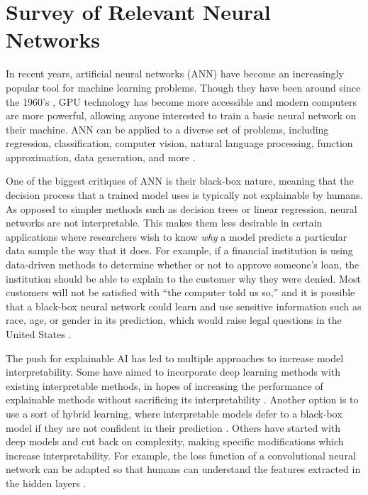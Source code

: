 \chapter{Survey of Relevant Neural Networks}

In recent years, artificial neural networks (ANN) have become an increasingly popular tool for machine learning problems. Though they have been around since the 1960's \cite{rosenblatt1961}, GPU technology has become more accessible and modern computers are more powerful, allowing anyone interested to train a basic neural network on their machine. ANN can be applied to a diverse set of problems, including regression, classification, computer vision, natural language processing, function approximation, data generation, and more \cite{hammerstrom1993} \cite{zhang2000}.

One of the biggest critiques of ANN is their black-box nature, meaning that the decision process that a trained model uses is typically not explainable by humans. As opposed to simpler methods such as decision trees or linear regression, neural networks are not interpretable. This makes them less desirable in certain applications where researchers wish to know \textit{why} a model predicts a particular data sample the way that it does. For example, if a financial institution is using data-driven methods to determine whether or not to approve someone's loan, the institution should be able to explain to the customer why they were denied. Most customers will not be satisfied with ``the computer told us so,'' and it is possible that a black-box neural network could learn and use sensitive information such as race, age, or gender in its prediction, which would raise legal questions in the United States \cite{ecoa}.

The push for explainable AI has led to multiple approaches to increase model interpretability. Some have aimed to incorporate deep learning methods with existing interpretable methods, in hopes of increasing the performance of explainable methods without sacrificing its interpretability \cite{goebel2018}. Another option is to use a sort of hybrid learning, where interpretable models defer to a black-box model if they are not confident in their prediction \cite{rafique2020}. Others have started with deep models and cut back on complexity, making specific modifications which increase interpretability. For example, the loss function of a convolutional neural network can be adapted so that humans can understand the features extracted in the hidden layers \cite{zhang2018interpretable}. 

